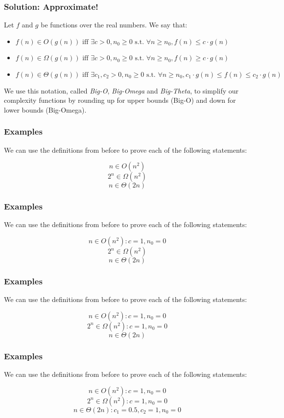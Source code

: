 \documentclass[aspectratio=169]{beamer}
\begin{document}
\begin{frame}
\frametitle{Solution: Approximate!}
Let $f$ and $g$ be functions over the real numbers. We say that:

\begin{itemize}
\item<1->$f(n) \in O(g(n)) \text{ iff } \exists c > 0, n_0 \geq 0 \text{ s.t. } \forall n \geq n_0, f(n) \leq c \cdot g(n)$

\item<2->$f(n) \in \Omega(g(n)) \text{ iff } \exists c > 0, n_0 \geq 0 \text{ s.t. } \forall n \geq n_0, f(n) \geq c \cdot g(n)$

\item<3->$f(n) \in \Theta(g(n)) \text{ iff } \exists c_1, c_2 > 0, n_0 \geq 0 \text{ s.t. } \forall n \geq n_0, c_1 \cdot g(n) \leq f(n) \leq c_2 \cdot g(n)$
\end{itemize}

We use this notation, called {\em Big-O}, {\em Big-Omega} and {\em Big-Theta}, to simplify our complexity functions by rounding up for upper bounds (Big-O) and down for lower bounds (Big-Omega).
\end{frame}

\begin{frame}
\frametitle{Examples}
We can use the definitions from before to prove each of the following statements:

$$n \in O(n^2)$$
$$2^n \in \Omega(n^2)$$
$$n \in \Theta(2n)$$
\end{frame}

\begin{frame}[noframenumbering]
\frametitle{Examples}
We can use the definitions from before to prove each of the following statements:

$$n \in O(n^2): c = 1, n_0 = 0$$
$$2^n \in \Omega(n^2)$$
$$n \in \Theta(2n)$$
\end{frame}

\begin{frame}[noframenumbering]
\frametitle{Examples}
We can use the definitions from before to prove each of the following statements:

$$n \in O(n^2): c = 1, n_0 = 0$$
$$2^n \in \Omega(n^2): c = 1, n_0 = 0$$
$$n \in \Theta(2n)$$
\end{frame}

\begin{frame}[noframenumbering]
\frametitle{Examples}
We can use the definitions from before to prove each of the following statements:

$$n \in O(n^2): c = 1, n_0 = 0$$
$$2^n \in \Omega(n^2): c = 1, n_0 = 0$$
$$n \in \Theta(2n): c_1 = 0.5, c_2 = 1, n_0 = 0$$
\end{frame}
\end{document}
